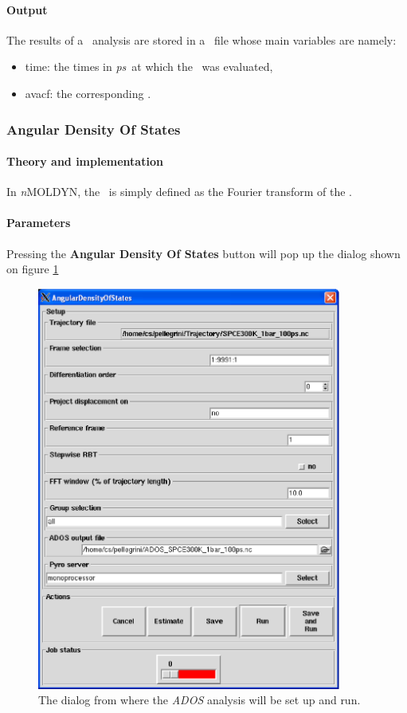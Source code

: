 \documentclass[a4paper,11pt]{report}
\newcommand{\ps}{\textit{ps}}
\begin{document}
\paragraph{Output\\}
The results of a \AVACF\ analysis are stored in a \NetCDF\ file whose main variables are namely:
\begin{itemize}
\item time: the times in \ps\ at which the \AVACF\ was evaluated,
\item avacf: the corresponding \AVACF.
\end{itemize}

\subsubsection{Angular Density Of States}
\label{ados}
\paragraph{Theory and implementation\\}
\label{ados_theory}
In \textit{n}MOLDYN, the \ADOS\ is simply defined as the Fourier transform of the \AVACF .

\paragraph{Parameters\\}
\label{ados_parameters}
Pressing the \textbf{Angular Density Of States} button will pop up the dialog shown on figure \ref{fig:ados}
\begin{figure}[h!]
\begin{center}
\includegraphics[width=10cm]{Figures/ados.eps}
\end{center}
\caption[The \textit{ADOS} analysis dialog]{The dialog from where the \textit{ADOS} analysis will be set up and run.}
\label{fig:ados}
\end{figure}   
\end{document}
